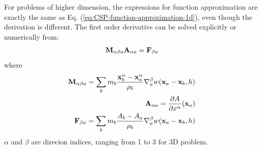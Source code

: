 \documentclass[journal abbreviation, manuscript]{copernicus}
\begin{document}
For problems of higher dimension, the expressions for function approximation are exactly the same as Eq. (\ref{eq:CSP-function-approximation-1d}), even though the derivation is different. The first order derivative can be solved explicitly or numerically from:
\begin{equation}
\text{\textbf{M}}_{\alpha \beta a} \textbf{A}_{\alpha a} = \textbf{F}_{\beta a}
\end{equation}
where
\begin{align}
\text{\textbf{M}}_{\alpha \beta a} = \sum_b m_b \dfrac{\textbf{x}_b^{\alpha} - \textbf{x}_a^{\alpha}}{\rho_b} \nabla_a^{\beta} w(\textbf{x}_a -\textbf{x}_b, h) \\
\textbf{A}_{\alpha a} = \dfrac{\partial A}{\partial x^{\alpha}} (\textbf{x}_a)\\
\textbf{F}_{\beta a} = \sum_b m_b \dfrac{A_b - A_a}{\rho_b} \nabla_a^{\beta} w(\textbf{x}_a -\textbf{x}_b, h)
\end{align}
$\alpha$ and $\beta$ are direcion indices, ranging from 1 to 3 for 3D problem. 
\end{document}
